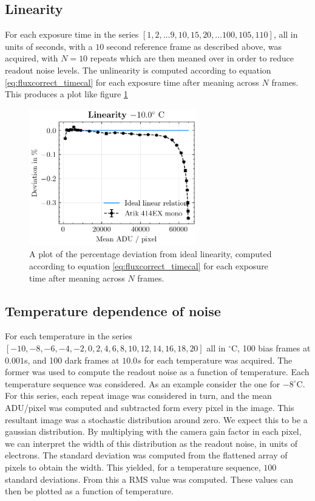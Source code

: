 \documentclass[../main.tex]{subfiles}
\begin{document}
		\subsection{Linearity}
		For each exposure time in the series 
		$[1, 2, \dots 9, 10, 15, 20, \dots 100, 105, 110]$, all in units of seconds, with a $10$ second reference frame as described above, was acquired, with $N = 10$ repeats which are then meaned over in order to reduce readout noise levels. The unlinearity is computed according to equation \ref{eq:fluxcorrect_timecal} for each exposure time after meaning across $N$ frames. This produces a plot like figure \ref{fig:linearity}
		
		\begin{figure}
			\centering			\includegraphics[width=0.65\textwidth]{linearity.png}
			\caption{A plot of the percentage deviation from ideal linearity, computed according to equation  \ref{eq:fluxcorrect_timecal} for each exposure time after meaning across $N$ frames. }
			\label{fig:linearity}
		\end{figure}
		
		\subsection{Temperature dependence of noise}\label{sec:rondc}
		For each temperature in the series $[-10, -8, -6, -4, -2, 0, 2, 4, 6, 8, 10, 12, 14, 16, 18, 20]$ all in $^\circ $C, 100 bias frames at $0.001$s, and 100 dark frames at $10.0s$ for each temperature was acquired. The former was used to compute the readout noise as a function of temperature. Each temperature sequence was considered. As an example consider the one for $-8^\circ$C. For this series, each repeat image was considered in turn, and the mean ADU/pixel was computed and subtracted form every pixel in the image. This resultant image was a stochastic distribution around zero. We expect this to be a gaussian distribution. By multiplying with the camera gain factor in each pixel, we can interpret the width of this distribution as the readout noise, in units of electrons. The standard deviation was computed from the flattened array of pixels to obtain the width. This yielded, for a temperature sequence, $100$ standard deviations. From this a RMS value was computed. These values can then be plotted as a function of temperature.
		
\end{document}
